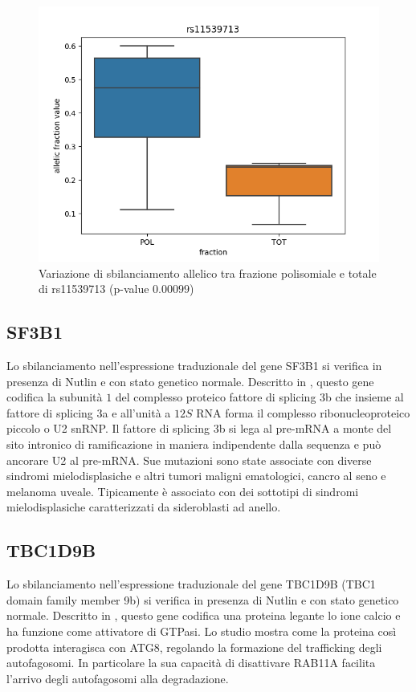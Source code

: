 \begin{multicols}{2}
\begin{figure}[H]
  \centering
  \includegraphics[scale=0.5]{shDHX30_DMSO_rs11539713.png}
  \caption{Variazione di sbilanciamento allelico tra frazione polisomiale e totale di rs11539713 (p-value $0.00099$)}
  \label{fig:KIF5B}
\end{figure}

\end{multicols}

	\subsection{SF3B1}
	Lo sbilanciamento nell'espressione traduzionale del gene SF3B1 si verifica in presenza di Nutlin e con stato genetico normale.
	Descritto in \cite{sf3b1}, questo gene codifica la subunit\`a $1$ del complesso proteico fattore di splicing 3b che insieme al fattore di splicing 3a e all'unit\`a a $12S$ RNA forma il complesso ribonucleoproteico piccolo o U2 snRNP.
	Il fattore di splicing 3b si lega al pre-mRNA a monte del sito intronico di ramificazione in maniera indipendente dalla sequenza e pu\`o ancorare U2 al pre-mRNA.
	Sue mutazioni sono state associate con diverse sindromi mielodisplasiche e altri tumori maligni ematologici, cancro al seno e melanoma uveale.
	Tipicamente \`e associato con dei sottotipi di sindromi mielodisplasiche caratterizzati da sideroblasti ad anello.

	\subsection{TBC1D9B}
	Lo sbilanciamento nell'espressione traduzionale del gene TBC1D9B (TBC1 domain family member 9b) si verifica in presenza di Nutlin e con stato genetico normale.
	Descritto in \cite{tbc1d9b}, questo gene codifica una proteina legante lo ione calcio e ha funzione come attivatore di GTPasi.
	Lo studio \cite{atf8} mostra come la proteina cos\`i prodotta interagisca con ATG8, regolando la formazione del trafficking degli autofagosomi.
	In particolare la sua capacit\`a di disattivare RAB11A facilita l'arrivo degli autofagosomi alla degradazione.

